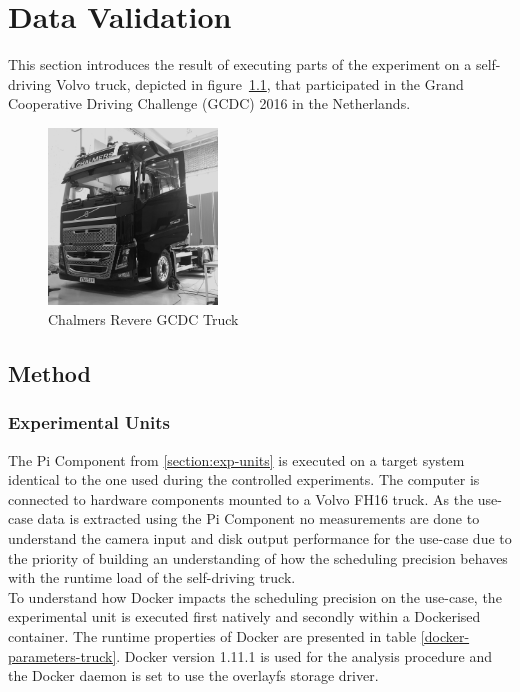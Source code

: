 \chapter{Data Validation}\label{section:data-validation}

This section introduces the result of executing parts of the experiment on a self-driving Volvo truck, depicted in figure~\ref{truck}, that participated in the Grand Cooperative Driving Challenge (GCDC) 2016 in the Netherlands. \\

\begin{figure}[ht]
\centering
     \includegraphics[width=0.4\textwidth]{./figure/truck.png}
      \caption{Chalmers Revere GCDC Truck}
       \label{truck}
\end{figure}


\section{Method}
\label{sec:truck-method}

\subsection{Experimental Units}
\label{sec:truck-expun}

The Pi Component from \ref{section:exp-units} is executed on a target system identical to the one used during the controlled experiments. The computer is connected to hardware components mounted to a Volvo FH16 truck. As the use-case data is extracted using the Pi Component no measurements are done to understand the camera input and disk output performance for the use-case due to the priority of building an understanding of how the scheduling precision behaves with the runtime load of the self-driving truck.\\

To understand how Docker impacts the scheduling precision on the use-case, the experimental unit is executed first natively and secondly within a Dockerised container. The runtime properties of Docker are presented in table \ref{docker-parameters-truck}. Docker version 1.11.1 is used for the analysis procedure and the Docker daemon is set to use the overlayfs storage driver.



